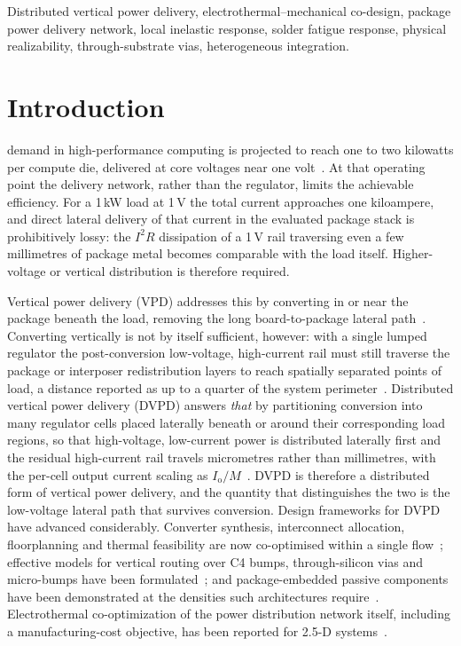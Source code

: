 \documentclass[journal]{IEEEtran}
\begin{document}
\begin{IEEEkeywords}
Distributed vertical power delivery, electrothermal--mechanical co-design, package power
delivery network, local inelastic response, solder fatigue response, physical realizability,
through-substrate vias, heterogeneous integration.
\end{IEEEkeywords}
\section{Introduction}\label{sec:intro}

 demand in high-performance computing is projected to reach one to
two kilowatts per compute die, delivered at core voltages near one
volt~\cite{Krishnakumar2026DVPD,Ramin_VPD}. At that operating point the delivery network,
rather than the regulator, limits the achievable efficiency. For a 1\,kW load at 1\,V the
total current approaches one kiloampere, and direct lateral delivery of that current in the
evaluated package stack is prohibitively lossy: the $I^{2}R$ dissipation of a 1\,V rail
traversing even a few millimetres of package metal becomes comparable with the load itself.
Higher-voltage or vertical distribution is therefore required.

Vertical power delivery (VPD) addresses this by converting in or near the package beneath
the load, removing the long board-to-package lateral path~\cite{Sriharini_ECTC_24}. Converting
vertically is not by itself sufficient, however: with a single lumped regulator the
post-conversion low-voltage, high-current rail must still traverse the package or interposer
redistribution layers to reach spatially separated points of load, a distance reported as up
to a quarter of the system perimeter~\cite{Krishnakumar2026DVPD}. Distributed vertical power
delivery (DVPD) answers \emph{that} by partitioning conversion into many regulator cells
placed laterally beneath or around their corresponding load regions, so that high-voltage,
low-current power is distributed laterally first and the residual high-current rail travels
micrometres rather than millimetres, with the per-cell output current scaling as
$I_{\mathrm{o}}/M$~\cite{Krishnakumar2026DVPD,Sriharini_ECTC_24,
VPD_transactions_on_power_electronics_new,
ISCAS2024DVPD,vertical_stacking_2025_TRansactions_power_electronics}. DVPD is therefore a
distributed form of vertical power delivery, and the quantity that distinguishes the two is
the low-voltage lateral path that survives conversion.
Design frameworks for DVPD have advanced considerably. Converter synthesis, interconnect
allocation, floorplanning and thermal feasibility are now co-optimised within a single
flow~\cite{Krishnakumar2026DVPD}; effective models for vertical routing over C4 bumps,
through-silicon vias and micro-bumps have been formulated~\cite{Sriharini_ECTC_24}; and
package-embedded passive components have been demonstrated at the densities such
architectures require~\cite{rasheedi2024embedded,multi-layer_inductor}. Electrothermal
co-optimization of the power distribution network itself, including a manufacturing-cost
objective, has been reported for 2.5-D systems~\cite{Wang2025TTSV}.
\end{document}
